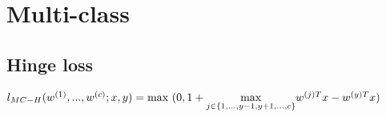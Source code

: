 \section*{Multi-class}
\subsection*{Hinge loss}
$l_{MC-H}(w^{(1)},...,w^{(c)};x,y) =\\
\text{max }(0,1+\underset{j\in\{1,...,y-1,y+1,...,c\}}{\operatorname{max}} w^{(j)T} x - w^{(y)T} x)$